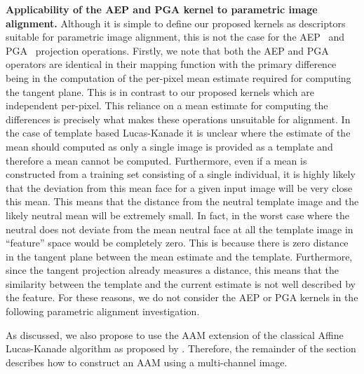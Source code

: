 \textbf{Applicability of the AEP and PGA kernel to parametric image alignment.}
Although it is simple to define our proposed kernels as descriptors suitable
for parametric image alignment, this is not the case for the
AEP~\cite{smith2006recovering} and PGA~\cite{smith2008facial} projection
operations. Firstly, we note that both the AEP and PGA operators are identical
in their mapping function with the primary difference being in the computation
of the per-pixel mean estimate required for computing the tangent plane. This
is in contrast to our proposed kernels which are independent per-pixel. This
reliance on a mean estimate for computing the differences is precisely what
makes these operations unsuitable for alignment. In the case of template based
Lucas-Kanade it is unclear where the estimate of the mean should computed as 
only a single image is provided as a template and therefore a mean cannot
be computed. Furthermore, even if a mean is constructed from a training set
consisting of a single individual, it is highly likely that the deviation
from this mean face for a given input image will be very close this mean. This
means that the distance from the neutral template image and the likely neutral
mean will be extremely small. In fact, in the worst case where the neutral does
not deviate from the mean neutral face at all the template image in ``feature''
space would be completely zero. This is because there is zero distance in
the tangent plane between the mean estimate and the template. Furthermore,
since the tangent projection already measures a distance, this means that
the similarity between the template and the current estimate is not well
described by the feature. For these reasons, we do not consider the AEP or PGA
kernels in the following parametric alignment investigation.

As discussed, we also propose to use the AAM extension of the classical 
Affine Lucas-Kanade algorithm as proposed by \citet{matthews2004active}.
Therefore, the remainder of the section describes how to construct an AAM
using a multi-channel image.
